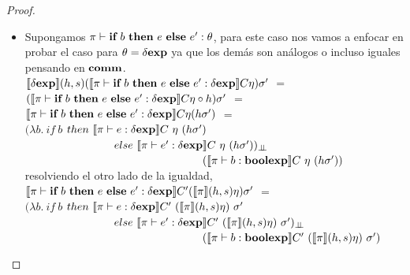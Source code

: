 \begin{proof}
\begin{itemize}
\begin{itemize}
hasta ac\'a ha sido simplemente reescribir usando definiciones, de esta manera llegamos
a poder aplicar la hip\'otesis inductiva,\\

$\neg_{\odot}
	(\semBrcks{\boolexp}(h,s)(\semBrcks{\pi \vdash e : \boolexp}C\eta)\sigma')$\\
$\neg_{\odot}
	(\semBrcks{\pi \vdash e : \boolexp}C(\semBrcks{\pi}(h,s)\eta)\sigma')$ $=$\\
$\semBrcks{\pi \vdash \neg e : \boolexp}C(\semBrcks{\pi}(h,s)\eta)\sigma'$

\item Supongamos $\pi \vdash \textbf{if} \ b \ \textbf{then} \ e \ \textbf{else} \ e' : \theta$, para este caso
nos vamos a enfocar en probar el caso para $\theta = \delta \textbf{exp}$ ya que los dem\'as
son an\'alogos o incluso iguales pensando en $\textbf{comm}$.\\

$\llbracket \delta \textbf{exp} \rrbracket(h,s)
	(\llbracket \pi \vdash \textbf{if} \ b \ \textbf{then} \ e \ \textbf{else} \ e' : \delta \textbf{exp} \rrbracket C\eta)\sigma'$ $=$\\
$(\llbracket \pi \vdash \textbf{if} \ b \ \textbf{then} \ e \ \textbf{else} \ e' : \delta \textbf{exp} \rrbracket C\eta \circ h)\sigma'$ $=$\\
$\llbracket \pi \vdash \textbf{if} \ b \ \textbf{then} \ e \ \textbf{else} \ e' : \delta \textbf{exp} \rrbracket C\eta (h\sigma')$ $=$\\
$(\lambda b . \ if \ b $ $then \ \llbracket  \pi \vdash e : \delta \textbf{exp} \rrbracket C \ \eta \ (h\sigma')$\\
\indent \ \ \ \ \ \ \ \ \ \ \ \ \ \ \ \ 
$else \ \llbracket  \pi \vdash e' : \delta \textbf{exp} \rrbracket C \ \eta \ (h\sigma'))_{\bot \!\!\! \bot}$ \\
\indent \ \ \ \ \ \ \ \ \ \ \ \ \ \ \ \ \ \ \ \ \ \ \ \ \ \ \ \ \ \ \ \
$(\llbracket  \pi \vdash b : \textbf{boolexp} \rrbracket C \ \eta \ (h\sigma'))$\\

resolviendo el otro lado de la igualdad,\\

$\llbracket \pi \vdash \textbf{if} \ b \ \textbf{then} \ e \ \textbf{else} \ e' : \delta \textbf{exp} \rrbracket C'
							(\llbracket \pi \rrbracket(h,s)\eta)\sigma'$ $=$\\
$(\lambda b . \ if \ b $ $then \ \semBrcks{ \pi \vdash e : \deltaexp}C' \ 
						(\semBrcks{\pi}(h,s)\eta) \ \sigma'$\\
\indent \ \ \ \ \ \ \ \ \ \ \ \ \ \ \ \ 
$else \ \semBrcks{ \pi \vdash e' : \deltaexp}C' \ 
						(\semBrcks{\pi}(h,s)\eta) \ \sigma')_{\dbot}$ \\
\indent \ \ \ \ \ \ \ \ \ \ \ \ \ \ \ \ \ \ \ \ \ \ \ \ \ \ \ \ \ \ \ \
$(\semBrcks{ \pi \vdash b : \boolexp}C' \ (\semBrcks{\pi}(h,s)\eta) \ \sigma')$\\


\end{itemize}
\end{itemize}
\end{proof}
